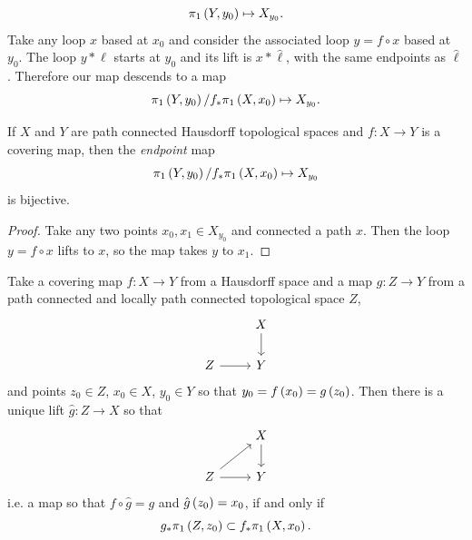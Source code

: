 \[
\pi_{1}\left(Y,y_0\right) \mapsto X_{y_0}.
\]
Take any loop \(x\) based at \(x_0\) and consider the associated loop \(y=f \circ x\) based at \(y_0\).
The loop \(y*\ell\) starts at \(y_0\) and its lift is \(x*\hat{\ell}\), with the same endpoints as \(\hat{\ell}\).
Therefore our map descends to a map
\[
\pi_{1}\left(Y,y_0\right)/f_* \pi_{1}\left(X,x_0\right) \mapsto X_{y_0}.
\]
\begin{lemma}
If \(X\) and \(Y\) are path connected Hausdorff topological spaces and \(f \colon X \to Y\) is a covering map, then the \emph{endpoint} map
\[
\pi_{1}\left(Y,y_0\right)/f_* \pi_{1}\left(X,x_0\right) \mapsto X_{y_0}
\]
is bijective.
\end{lemma}
\begin{proof}
Take any two points \(x_0, x_1 \in X_{y_0}\) and connected a path \(x\).
Then the loop \(y = f \circ x\) lifts to \(x\), so the map takes \(y\) to \(x_1\).
\end{proof}
\begin{proposition}\label{proposition:lift.map}
Take a covering map \(f \colon X \to Y\) from a Hausdorff space and a map \(g \colon Z \to Y\) from a path connected and locally path connected topological space \(Z\), 
\[
\begin{tikzcd}
      & X \arrow[d] \\
Z \arrow[r] & Y 
\end{tikzcd}
\]
and points \(z_0 \in Z\), \(x_0 \in X\), \(y_0 \in Y\) so that \(y_0=f\left(x_0\right)=g\left(z_0\right)\).
Then there is a unique lift \(\hat{g} \colon Z \to X\) so that
\[
\begin{tikzcd}
      & X \arrow[d] \\
Z \arrow[r] \arrow[ur] & Y 
\end{tikzcd}
\]
i.e. a map so that \(f \circ \hat{g}=g\) and \(\hat{g}\left(z_0\right)=x_0\), if and only if 
\[
g_* \pi_{1}\left(Z,z_0\right) \subset f_* \pi_{1}\left(X,x_0\right).
\] 
\end{proposition}
